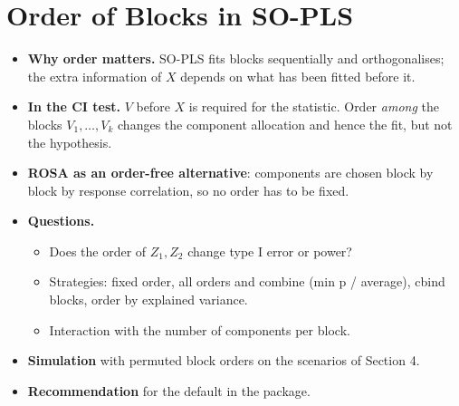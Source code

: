 \documentclass[10pt,leqno]{amsart}
\begin{document}
\section{Order of Blocks in SO-PLS}
\begin{itemize}
\item \textbf{Why order matters.} SO-PLS fits blocks sequentially and orthogonalises;
  the extra information of $X$ depends on what has been fitted before it.
\item \textbf{In the CI test.} $V$ before $X$ is required for the statistic. Order
  \emph{among} the blocks $V_1,\dots,V_k$ changes the component allocation and
  hence the fit, but not the hypothesis.
\item \textbf{ROSA as an order-free alternative}: components are chosen block by
  block by response correlation, so no order has to be fixed.
\item \textbf{Questions.}
  \begin{itemize}
  \item Does the order of $Z_1,Z_2$ change type I error or power?
  \item Strategies: fixed order, all orders and combine (min p / average),
    cbind blocks, order by explained variance.
  \item Interaction with the number of components per block.
  \end{itemize}
\item \textbf{Simulation} with permuted block orders on the scenarios of Section 4.
\item \textbf{Recommendation} for the default in the package.
\end{itemize}

\end{document}
